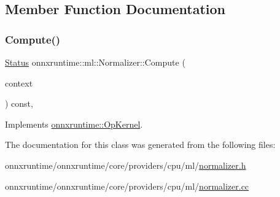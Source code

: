 \subsection{Member Function Documentation}
\mbox{\label{classonnxruntime_1_1ml_1_1Normalizer_a5e5ba42fda13b3818698b51f000ceacd}} 
\subsubsection{\texorpdfstring{Compute()}{Compute()}}
{\footnotesize\ttfamily \mbox{\hyperlink{classonnxruntime_1_1common_1_1Status}{Status}} onnxruntime\+::ml\+::\+Normalizer\+::\+Compute (\begin{DoxyParamCaption}\item[{\mbox{\hyperlink{classonnxruntime_1_1OpKernelContext}{Op\+Kernel\+Context}} $\ast$}]{context }\end{DoxyParamCaption}) const\hspace{0.3cm}{\ttfamily [override]}, {\ttfamily [virtual]}}



Implements \mbox{\hyperlink{classonnxruntime_1_1OpKernel_a9eca8656a78b1b3ab9d3351a12798650}{onnxruntime\+::\+Op\+Kernel}}.



The documentation for this class was generated from the following files\+:\begin{DoxyCompactItemize}
\item 
onnxruntime/onnxruntime/core/providers/cpu/ml/\mbox{\hyperlink{normalizer_8h}{normalizer.\+h}}\item 
onnxruntime/onnxruntime/core/providers/cpu/ml/\mbox{\hyperlink{normalizer_8cc}{normalizer.\+cc}}\end{DoxyCompactItemize}
